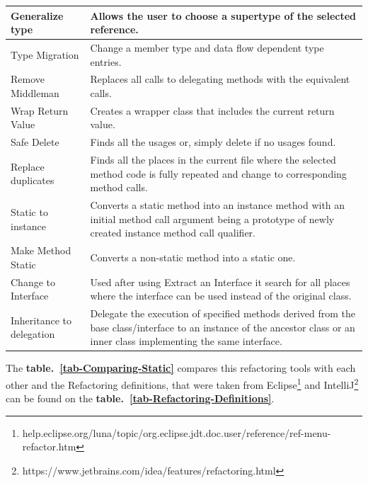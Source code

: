 \begin{table}[htbp]
\begin{tabular}{ p{2.95cm}| p{9.15cm}}
Generalize type           & Allows the user to choose a supertype of the selected reference.                                                                                                          \\ \hline
Type Migration            & Change a member type and data flow dependent type entries.                                                                                                                \\ \hline
Remove Middleman          & Replaces all calls to delegating methods with the equivalent calls.                                                                                                       \\ \hline
Wrap Return Value         & Creates a wrapper class that includes the current return value.                                                                                                           \\ \hline
Safe Delete               & Finds all the usages or, simply delete if no usages found.                                                                                                                \\ \hline
Replace duplicates        & Finds all the places in the current file where the selected method code is fully repeated and change to corresponding method calls.                                      \\ \hline
Static to instance        & Converts a static method into an instance method with an initial method call argument being a prototype of newly created instance method call qualifier.                  \\ \hline
Make Method Static        & Converts a non-static method into a static one.                                                                                                                           \\ \hline
Change to Interface       & Used after using Extract an Interface it search for all places where the interface can be used instead of the original class.                                             \\ \hline
Inheritance to delegation & Delegate the execution of specified methods derived from the base class/interface to an instance of the ancestor class or an inner class implementing the same interface. \\ \hline
\end{tabular}
\end{table}
The {\bf table.~\ref{tab-Comparing-Static}} compares this refactoring tools with each other and the Refactoring definitions, that were taken from Eclipse\footnote{help.eclipse.org/luna/topic/org.eclipse.jdt.doc.user/reference/ref-menu-refactor.htm} and IntelliJ\footnote{https://www.jetbrains.com/idea/features/refactoring.html} can be found on the {\bf table.~\ref{tab-Refactoring-Definitions}}.

